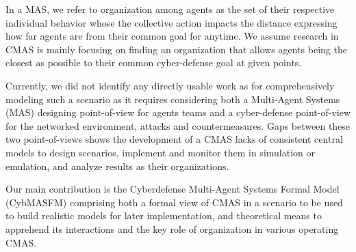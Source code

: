 \documentclass[conference]{IEEEtran}
\begin{document}
In a MAS, we refer to organization among agents as the set of their respective individual behavior whose the collective action impacts the distance expressing how far agents are from their common goal for anytime. We assume research in CMAS is mainly focusing on finding an organization that allows agents being the closest as possible to their common cyber-defense goal at given points.


Currently, we did not identify any directly usable work as for comprehensively modeling such a scenario as it requires considering both a Multi-Agent Systems (MAS) designing point-of-view for agents teams and a cyber-defense point-of-view for the networked environment, attacks and countermeasures.
Gaps between these two point-of-views shows the development of a CMAS lacks of consistent central models to design scenarios, implement and monitor them in simulation or emulation, and analyze results as their organizations.

Our main contribution is the Cyberdefense Multi-Agent Systems Formal Model (CybMASFM) comprising both a formal view of CMAS in a scenario to be used to build realistic models for later implementation, and theoretical means to apprehend its interactions and the key role of organization in various operating CMAS.


\end{document}
